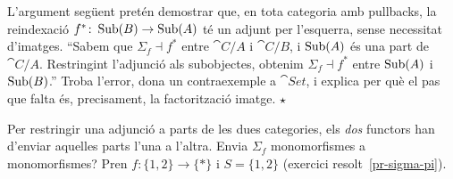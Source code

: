 \begin{exercici}
L'argument següent pretén demostrar que, en tota categoria amb pullbacks, la reindexació $f^{*}\colon\operatorname{Sub}(B)\to\operatorname{Sub}(A)$ té un adjunt per l'esquerra, sense necessitat d'imatges. \enquote{Sabem que $\Sigma_f\dashv f^{*}$ entre $\cat{C}/A$ i $\cat{C}/B$, i $\operatorname{Sub}(A)$ és una part de $\cat{C}/A$. Restringint l'adjunció als subobjectes, obtenim $\Sigma_f\dashv f^{*}$ entre $\operatorname{Sub}(A)$ i $\operatorname{Sub}(B)$.} Troba l'error, dona un contraexemple a $\cat{Set}$, i explica per què el pas que falta és, precisament, la factorització imatge. \hfill{\normalfont$\star$}
\begin{indicacio}
Per restringir una adjunció a parts de les dues categories, els \emph{dos} functors han d'enviar aquelles parts l'una a l'altra. Envia $\Sigma_f$ monomorfismes a monomorfismes? Pren $f\colon\{1,2\}\to\{\ast\}$ i $S=\{1,2\}$ (exercici resolt~\ref{pr-sigma-pi}).
\end{indicacio}
\end{exercici}

